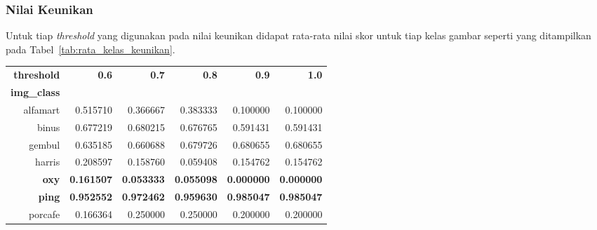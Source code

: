 \subsubsection{Nilai Keunikan}
Untuk tiap \textit{threshold} yang digunakan pada nilai keunikan didapat rata-rata nilai skor untuk tiap kelas gambar seperti yang ditampilkan pada Tabel~\ref{tab:rata_kelas_keunikan}.
\begin{table}[H]
	\centering
	\begin{tabular}{|r|r|r|r|r|r|}
		\hline
		\textbf{threshold}  & \multirow{2}{*}{\textbf{0.6}} & \multirow{2}{*}{\textbf{0.7}} & \multirow{2}{*}{\textbf{0.8}} & \multirow{2}{*}{\textbf{0.9}} & \multirow{2}{*}{\textbf{1.0}} \\ \cline{1-1}
		\textbf{img\_class} &                               &                               &                               &                               &                               \\ \hline
		alfamart            & 0.515710                      & 0.366667                      & 0.383333                      & 0.100000                      & 0.100000                      \\ \hline
		binus               & 0.677219                      & 0.680215                      & 0.676765                      & 0.591431                      & 0.591431                      \\ \hline
		gembul              & 0.635185                      & 0.660688                      & 0.679726                      & 0.680655                      & 0.680655                      \\ \hline
		harris              & 0.208597                      & 0.158760                      & 0.059408                      & 0.154762                      & 0.154762                      \\ \hline
		\textbf{oxy}                 & \textbf{0.161507}                      & \textbf{0.053333}                      & \textbf{0.055098}                      & \textbf{0.000000}                      & \textbf{0.000000}                      \\ \hline
		\textbf{ping}                & \textbf{0.952552}                      & \textbf{0.972462}                      & \textbf{0.959630}                      & \textbf{0.985047}                      & \textbf{0.985047}                      \\ \hline
		porcafe             & 0.166364                      & 0.250000                      & 0.250000                      & 0.200000                      & 0.200000                      \\ \hline

\end{tabular}
\end{table}
